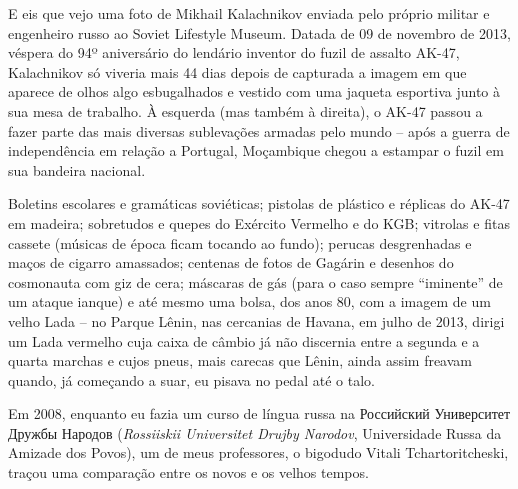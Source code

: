 E eis que vejo uma foto de Mikhail Kalachnikov enviada pelo próprio
militar e engenheiro russo ao Soviet Lifestyle Museum. Datada de 09 de
novembro de 2013, véspera do 94º aniversário do lendário inventor do
fuzil de assalto AK-47, Kalachnikov só viveria mais 44 dias depois de
capturada a imagem em que aparece de olhos algo esbugalhados e vestido
com uma jaqueta esportiva junto à sua mesa de trabalho. À esquerda (mas
também à direita), o AK-47 passou a fazer parte das mais diversas
sublevações armadas pelo mundo -- após a guerra de independência em
relação a Portugal, Moçambique chegou a estampar o fuzil em sua bandeira
nacional.

Boletins escolares e gramáticas soviéticas; pistolas de plástico e
réplicas do AK-47 em madeira; sobretudos e quepes do Exército Vermelho e
do KGB; vitrolas e fitas cassete (músicas de época ficam tocando ao
fundo); perucas desgrenhadas e maços de cigarro amassados; centenas de
fotos de Gagárin e desenhos do cosmonauta com giz de cera; máscaras de
gás (para o caso sempre ``iminente'' de um ataque ianque) e até mesmo
uma bolsa, dos anos 80, com a imagem de um velho Lada -- no Parque
Lênin, nas cercanias de Havana, em julho de 2013, dirigi um Lada
vermelho cuja caixa de câmbio já não discernia entre a segunda e a
quarta marchas e cujos pneus, mais carecas que Lênin, ainda assim
freavam quando, já começando a suar, eu pisava no pedal até o talo.

Em 2008, enquanto eu fazia um curso de língua russa na Российский
Университет Дружбы Народов (\emph{Rossiiskii Universitet Drujby
Narodov}, Universidade Russa da Amizade dos Povos), um de meus
professores, o bigodudo Vitali Tchartoritcheski, traçou uma comparação
entre os novos e os velhos tempos.

